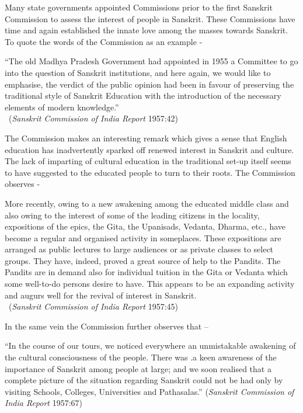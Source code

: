 Many state governments appointed Commissions prior to the first Sanskrit Commission to assess the interest of people in Sanskrit. These Commissions have time and again established the innate love among the masses towards Sanskrit. To quote the words of the Commission as an example - 
\begin{myquote}
\eleven
“The old Madhya Pradesh Government had appointed in 1955 a Committee to go into the question of Sanskrit institutions, and here again, we would like to emphasise, the verdict of the public opinion had been in favour of preserving the traditional style of Sanskrit Education with the introduction of the necessary elements of modern knowledge.”\\[-15pt]

~\hfill ({\sl Sanskrit Commission of India Report} 1957:42)
\end{myquote}

The Commission makes an interesting remark which gives a sense that English education has inadvertently sparked off renewed interest in Sanskrit and culture. The lack of imparting of cultural education in the traditional set-up itself seems to have suggested to the educated people to turn to their roots. The Commission observes -        
\begin{myquote}
\eleven
More recently, owing to a new awakening among the educated middle class and also owing to the interest of some of the leading citizens in the locality, expositions of the epics, the Gita, the Upanisads, Vedanta, Dharma, etc., have become a regular and organised activity in some\break places. These expositions are arranged as public lectures to large audiences or as private classes to select groups. They have, indeed, proved a great source of help to the Pandits. The Pandits are in demand also for individual tuition in the Gita or Vedanta which some well-to-do persons desire to have. This appears to be an expanding activity and augurs well for the revival of interest in Sanskrit.\\[-15pt]

~\hfill ({\sl Sanskrit Commission of India Report} 1957:45)
\end{myquote}

In the same vein the Commission further observes that – 
\begin{myquote}
\eleven
“In the course of our tours, we noticed everywhere an unmistakable awakening of the cultural consciousness of the people. There was .a keen awareness of the importance of Sanskrit among people at large; and we soon realised that a complete picture of the situation regarding Sanskrit could not be had only by visiting Schools, Colleges, Universities and Pathasalas.” \hfill ({\sl Sanskrit Commission of India Report} 1957:67)
\end{myquote}
\newpage

